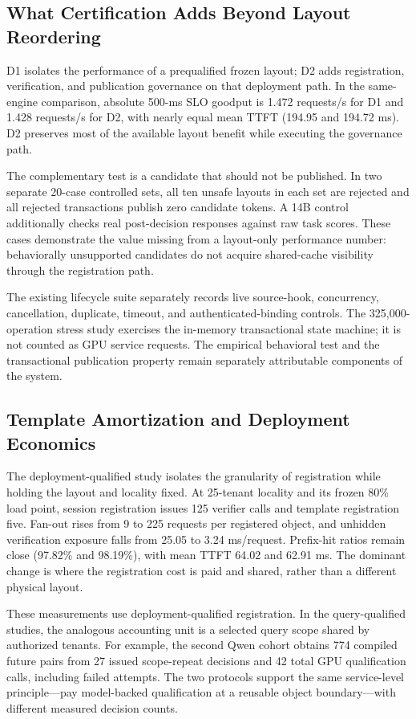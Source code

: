 \subsection{What Certification Adds Beyond Layout Reordering}
\label{sec:ablation}
D1 isolates the performance of a prequalified frozen layout; D2 adds registration, verification, and publication governance on that deployment path. In the same-engine comparison, absolute 500-ms SLO goodput is 1.472 requests/s for D1 and 1.428 requests/s for D2, with nearly equal mean TTFT (194.95 and 194.72 ms). D2 preserves most of the available layout benefit while executing the governance path.

The complementary test is a candidate that should not be published. In two separate 20-case controlled sets, all ten unsafe layouts in each set are rejected and all rejected transactions publish zero candidate tokens. A 14B control additionally checks real post-decision responses against raw task scores. These cases demonstrate the value missing from a layout-only performance number: behaviorally unsupported candidates do not acquire shared-cache visibility through the registration path.

The existing lifecycle suite separately records live source-hook, concurrency, cancellation, duplicate, timeout, and authenticated-binding controls. The 325,000-operation stress study exercises the in-memory transactional state machine; it is not counted as GPU service requests. The empirical behavioral test and the transactional publication property remain separately attributable components of the system.

\subsection{Template Amortization and Deployment Economics}
\label{sec:deployment}
The deployment-qualified study isolates the granularity of registration while holding the layout and locality fixed. At 25-tenant locality and its frozen 80\% load point, session registration issues 125 verifier calls and template registration five. Fan-out rises from 9 to 225 requests per registered object, and unhidden verification exposure falls from 25.05 to 3.24 ms/request. Prefix-hit ratios remain close (97.82\% and 98.19\%), with mean TTFT 64.02 and 62.91 ms. The dominant change is where the registration cost is paid and shared, rather than a different physical layout.

These measurements use deployment-qualified registration. In the query-qualified studies, the analogous accounting unit is a selected query scope shared by authorized tenants. For example, the second Qwen cohort obtains 774 compiled future pairs from 27 issued scope-repeat decisions and 42 total GPU qualification calls, including failed attempts. The two protocols support the same service-level principle---pay model-backed qualification at a reusable object boundary---with different measured decision counts.

